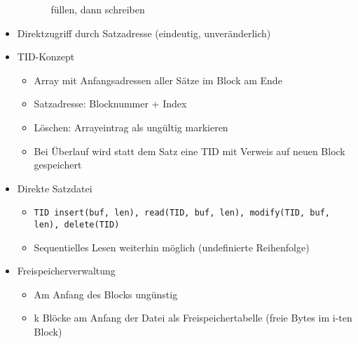 \documentclass[11pt, paper=a4, twocolumn]{scrartcl}
\begin{document}
\begin{itemize}
\begin{itemize}
\begin{itemize}
								füllen, dann schreiben
						\end{itemize}
				\end{itemize}
			\item Direktzugriff durch Satzadresse (eindeutig, unveränderlich)
			\item TID-Konzept
				\begin{itemize}
					\item Array mit Anfangsadressen aller Sätze im 
						Block am Ende
					\item Satzadresse: Blocknummer + Index
					\item Löschen: Arrayeintrag als ungültig markieren
					\item Bei Überlauf wird statt dem Satz eine TID 
						mit Verweis auf neuen Block gespeichert
				\end{itemize}
			\item Direkte Satzdatei
				\begin{itemize}
					\item \texttt{TID insert(buf, len), 
						read(TID, buf, len), 
						modify(TID, buf, len), delete(TID)}
					\item Sequentielles Lesen weiterhin möglich 
						(undefinierte Reihenfolge)
				\end{itemize}
			\item Freispeicherverwaltung
				\begin{itemize}
					\item Am Anfang des Blocks ungünstig
					\item k Blöcke am Anfang der Datei als 
						Freispeichertabelle (freie Bytes im i-ten 
						Block)
				\end{itemize}
		\end{itemize}
\end{document}
